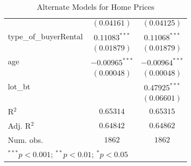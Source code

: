 \begin{table}
\begin{center}
\begin{tabular}{l c c}
                           & $(0.04161)$      & $(0.04125)$      \\
type\_of\_buyerRental      & $0.11083^{***}$  & $0.11068^{***}$  \\
                           & $(0.01879)$      & $(0.01879)$      \\
age                        & $-0.00965^{***}$ & $-0.00964^{***}$ \\
                           & $(0.00048)$      & $(0.00048)$      \\
lot\_bt                    &                  & $0.47925^{***}$  \\
                           &                  & $(0.06601)$      \\
\hline
R$^2$                      & $0.65314$        & $0.65315$        \\
Adj. R$^2$                 & $0.64842$        & $0.64862$        \\
Num. obs.                  & $1862$           & $1862$           \\
\hline
\multicolumn{3}{l}{\scriptsize{$^{***}p<0.001$; $^{**}p<0.01$; $^{*}p<0.05$}}
\end{tabular}
\caption{Alternate Models for Home Prices}
\label{tab:reg_sq_lot_bt}
\end{center}
\end{table}
